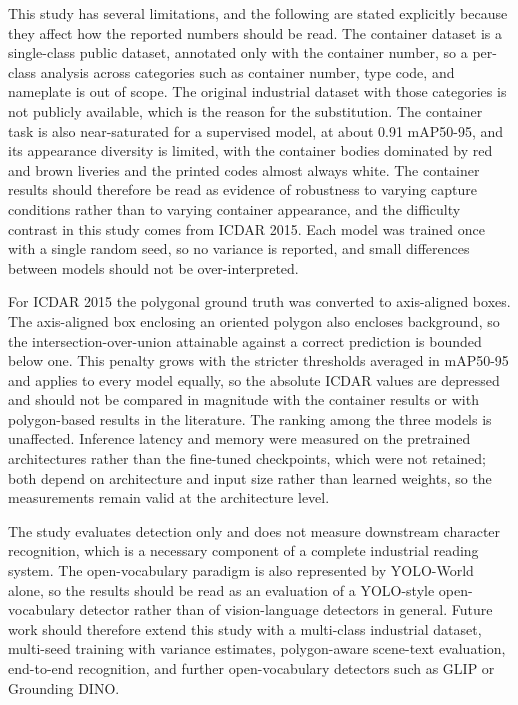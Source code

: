\documentclass[conference]{IEEEtran}
\begin{document}
This study has several limitations, and the following are stated explicitly because they affect how the reported numbers should be read. The container dataset is a single-class public dataset, annotated only with the container number, so a per-class analysis across categories such as container number, type code, and nameplate is out of scope. The original industrial dataset with those categories is not publicly available, which is the reason for the substitution. The container task is also near-saturated for a supervised model, at about 0.91 mAP50-95, and its appearance diversity is limited, with the container bodies dominated by red and brown liveries and the printed codes almost always white. The container results should therefore be read as evidence of robustness to varying capture conditions rather than to varying container appearance, and the difficulty contrast in this study comes from ICDAR 2015. Each model was trained once with a single random seed, so no variance is reported, and small differences between models should not be over-interpreted.

For ICDAR 2015 the polygonal ground truth was converted to axis-aligned boxes. The axis-aligned box enclosing an oriented polygon also encloses background, so the intersection-over-union attainable against a correct prediction is bounded below one. This penalty grows with the stricter thresholds averaged in mAP50-95 and applies to every model equally, so the absolute ICDAR values are depressed and should not be compared in magnitude with the container results or with polygon-based results in the literature. The ranking among the three models is unaffected. Inference latency and memory were measured on the pretrained architectures rather than the fine-tuned checkpoints, which were not retained; both depend on architecture and input size rather than learned weights, so the measurements remain valid at the architecture level.

The study evaluates detection only and does not measure downstream character recognition, which is a necessary component of a complete industrial reading system. The open-vocabulary paradigm is also represented by YOLO-World alone, so the results should be read as an evaluation of a YOLO-style open-vocabulary detector rather than of vision-language detectors in general. Future work should therefore extend this study with a multi-class industrial dataset, multi-seed training with variance estimates, polygon-aware scene-text evaluation, end-to-end recognition, and further open-vocabulary detectors such as GLIP or Grounding DINO.
\end{document}
